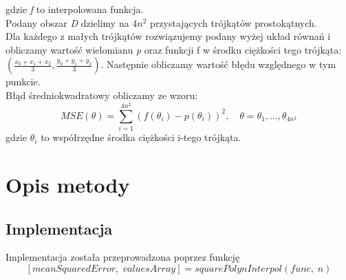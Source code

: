 \documentclass[12pt, leqno]{article}
\begin{document}
        gdzie \textit{f} to interpolowana funkcja.\\[3mm]
        Podany obszar \textit{D} dzielimy na $4n^2$ przystających 
        trójkątów prostokątnych.\\
        Dla każdego z małych trójkątów rozwiązujemy podany wyżej układ równań i obliczamy 
        wartość wielomianu \textit{p} oraz funkcji f w środku ciężkości tego trójkąta:
        {\large $(\frac{x_0 + x_1 + x_2}{3}, \frac{y_0 + y_1 + y_2}{3})$}. Następnie obliczamy wartość 
        błędu względnego w tym punkcie.\\[3mm]
        Błąd średniokwadratowy obliczamy ze wzoru:
        \[
            MSE(\theta) = \sum\limits_{i=1}^{4n^2} (f(\theta_i) - p(\theta_i))^2,\quad 
            \theta = {\theta_1, ... , \theta_{4n^2}}
        \]
        gdzie $\theta_i$ to współrzędne środka ciężkości i-tego trójkąta.

    \section{Opis metody}
            \subsection*{Implementacja}
            Implementacja została przeprowadzona poprzez funkcję
            \[ [meanSquaredError,\; valuesArray] = squarePolynInterpol(func,\; n)\]
\end{document}
